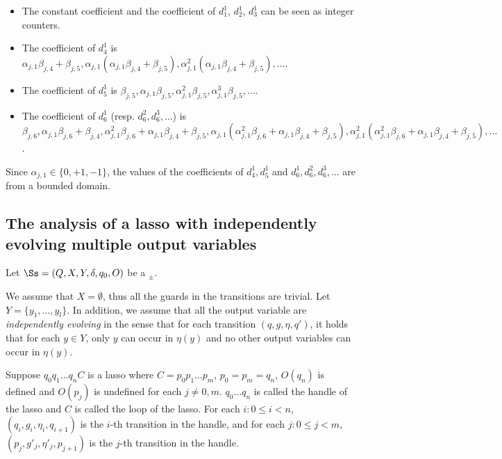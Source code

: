 \begin{itemize}
\item The constant coefficient and the coefficient of $d^1_1$, $d^1_2$, $d^1_3$ can be seen as integer counters.  

\item The coefficient of $d^1_4$ is $\alpha_{j,1} \beta_{j,4}+\beta_{j,5}, \alpha_{j,1}(\alpha_{j,1} \beta_{j,4}+\beta_{j,5}), \alpha^2_{j,1}(\alpha_{j,1} \beta_{j,4}+\beta_{j,5}), \dots$.

\item The coefficient of $d^1_5$ is $\beta_{j,5},\alpha_{j,1}\beta_{j,5}, \alpha^2_{j,1}\beta_{j,5},\alpha^3_{j,1}\beta_{j,5},\dots$.

\item The coefficient of $d^1_6$ (resp. $d^2_6,d^3_6,\dots$) is $\beta_{j,6}, \alpha_{j,1}\beta_{j,6}+\beta_{j,4}, \alpha^2_{j,1}\beta_{j,6}+\alpha_{j,1}\beta_{j,4}+\beta_{j,5}, \alpha_{j,1}(\alpha^2_{j,1}\beta_{j,6}+\alpha_{j,1}\beta_{j,4}+\beta_{j,5}),\alpha^2_{j,1}(\alpha^2_{j,1}\beta_{j,6}+\alpha_{j,1}\beta_{j,4}+\beta_{j,5}),\dots$.
\end{itemize}
Since $\alpha_{j,1} \in\{0,+1,-1\}$, the values of the coefficients of $d^1_4,d^1_5$ and $d^1_6,d^2_6,d^3_6,\dots$ are from a bounded domain.












\subsection{The analysis of a lasso with independently evolving multiple output variables}

Let $\Ss=(Q, X, Y, \delta, q_0, O)$ be a \SDSIT$_{\pm}$. 

We assume that $X=\emptyset$, thus all the guards in the transitions are trivial. Let $Y=\{y_1,\dots,y_l\}$. In addition, we assume that all the output variable are \emph{independently evolving} in the sense that for each transition $(q,g, \eta, q')$, it holds that for each $y \in Y$, only $y$ can occur in $\eta(y)$ and no other output variables can occur in $\eta(y)$. 

Suppose $q_0 q_1 \dots q_n C$ is a lasso where $C=p_0 p_1 \dots p_m$, $p_0 = p_m=q_n$, $O(q_n)$ is defined and $O(p_j)$ is undefined for each $j \neq 0,m$. $q_0 \dots q_n$ is called the handle of the lasso and $C$ is called the loop of the lasso. For each $i: 0 \le i < n$, $(q_i, g_i, \eta_i, q_{i+1})$ is the $i$-th transition in the handle, and for each $j: 0 \le j < m$, $(p_j, g'_j, \eta'_j, p_{j+1})$ is the $j$-th transition in the handle. 

